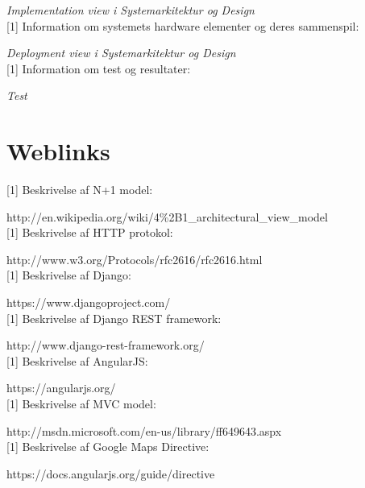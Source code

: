 \qquad \textit{ Implementation view i Systemarkitektur og Design} \\


[1] Information om systemets hardware elementer og deres sammenspil:
\vspace{-0.3cm}

\qquad \textit{Deployment view i Systemarkitektur og Design} \\


[1] Information om test og resultater:
\vspace{-0.3cm}

\qquad \textit{Test} \\


\newpage

\section*{Weblinks}
 
[1] Beskrivelse af N+1 model:
\vspace{-0.3cm}

\qquad http://en.wikipedia.org/wiki/4\%2B1\_architectural\_view\_model \\ 


[1] Beskrivelse af HTTP protokol:
\vspace{-0.3cm}

\qquad  http://www.w3.org/Protocols/rfc2616/rfc2616.html\\


[1] Beskrivelse af Django:
\vspace{-0.3cm}

\qquad https://www.djangoproject.com/ \\ 


[1] Beskrivelse af Django REST framework:
\vspace{-0.3cm}

\qquad http://www.django-rest-framework.org/ \\ 


[1] Beskrivelse af AngularJS:
\vspace{-0.3cm}

\qquad https://angularjs.org/ \\ 


[1] Beskrivelse af MVC model:
\vspace{-0.3cm}

\qquad http://msdn.microsoft.com/en-us/library/ff649643.aspx \\ 


[1] Beskrivelse af Google Maps Directive:
\vspace{-0.3cm}

\qquad https://docs.angularjs.org/guide/directive  
